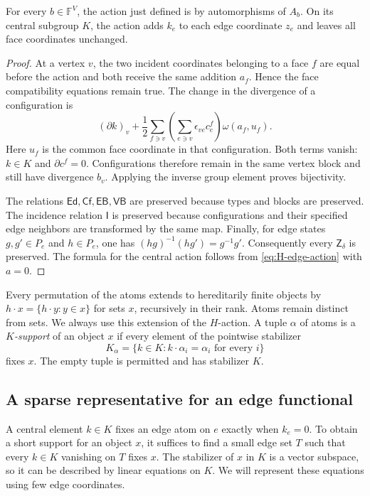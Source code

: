 \begin{lemma}\label{lem:H-automorphisms}
For every $b\in\mathbb F^V$, the action just defined is by automorphisms of
$A_b$. On its central subgroup $K$, the action adds $k_e$ to each edge
coordinate $z_e$ and leaves all face coordinates unchanged.
\end{lemma}
\begin{proof}
At a vertex $v$, the two incident coordinates belonging to a face $f$
are equal before the action and both receive the same addition $a_f$.
Hence the face compatibility equations remain true. The change in the
divergence of a configuration is
\[
 (\partial k)_v+\frac12\sum_{f\ni v}
   \left(\sum_{e\ni v}\epsilon_{ve}c^f_e\right)
                        \omega(a_f,u_f).
\]
Here $u_f$ is the common face coordinate in that configuration. Both terms
vanish: $k\in K$ and $\partial c^f=0$. Configurations therefore remain in
the same vertex block and still have divergence $b_v$. Applying the inverse
group element proves bijectivity.

The relations $\mathsf{Ed},\mathsf{Cf},\mathsf{EB},\mathsf{VB}$ are
preserved because types and blocks are preserved. The incidence relation
$\mathsf I$ is preserved because configurations and their specified edge
neighbors are transformed by the same map. Finally, for edge states
$g,g'\in P_e$ and $h\in P_e$, one has $(hg)^{-1}(hg')=g^{-1}g'$.
Consequently every $\mathsf Z_\delta$ is preserved. The formula for the
central action follows from \eqref{eq:H-edge-action} with $a=0$.
\end{proof}

Every permutation of the atoms extends to hereditarily finite objects by
$h\cdot x=\{h\cdot y:y\in x\}$ for sets $x$, recursively in their rank.
Atoms remain distinct from sets. We always use this extension of the
$H$-action. A tuple $\alpha$ of atoms is a \emph{$K$-support} of an object
$x$ if every element of the pointwise stabilizer
\[
 K_\alpha=\{k\in K:k\cdot\alpha_i=\alpha_i\text{ for every }i\}
\]
fixes $x$. The empty tuple is permitted and has stabilizer $K$.

\subsection{A sparse representative for an edge functional}

A central element $k\in K$ fixes an edge atom on $e$ exactly when
$k_e=0$. To obtain a short support for an object $x$, it suffices to find
a small edge set $T$ such that every $k\in K$ vanishing on $T$ fixes $x$.
The stabilizer of $x$ in $K$ is a vector subspace, so it can be described
by linear equations on $K$. We will represent these equations using few
edge coordinates.

